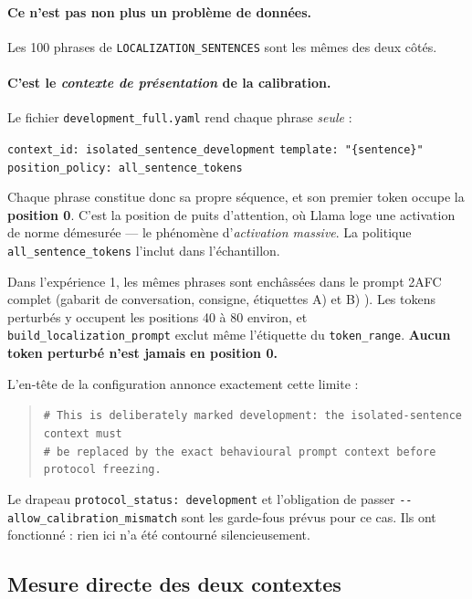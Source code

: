 \documentclass[11pt,a4paper]{article}
\newcommand{\code}[1]{\texttt{\small #1}}
\begin{document}
\paragraph{Ce n'est pas non plus un problème de données.} Les \num{100} phrases de
\code{LOCALIZATION\_SENTENCES} sont les mêmes des deux côtés.

\paragraph{C'est le \emph{contexte de présentation} de la calibration.} Le fichier
\code{development\_full.yaml} rend chaque phrase \emph{seule} :

\begin{center}
\code{context\_id: isolated\_sentence\_development} \quad
\code{template: "\{sentence\}"} \quad
\code{position\_policy: all\_sentence\_tokens}
\end{center}

\noindent
Chaque phrase constitue donc sa propre séquence, et son premier token occupe la
\textbf{position 0}. C'est la position de puits d'attention, où Llama loge une activation
de norme démesurée --- le phénomène d'\emph{activation massive}. La politique
\code{all\_sentence\_tokens} l'inclut dans l'échantillon.

Dans l'expérience 1, les mêmes phrases sont enchâssées dans le prompt 2AFC complet
(gabarit de conversation, consigne, étiquettes \og A) \fg{} et \og B) \fg). Les tokens
perturbés y occupent les positions \num{40} à \num{80} environ, et
\code{build\_localization\_prompt} exclut même l'étiquette du \code{token\_range}.
\textbf{Aucun token perturbé n'est jamais en position 0.}

L'en-tête de la configuration annonce exactement cette limite :

\begin{quote}\small
\code{\# This is deliberately marked development: the isolated-sentence context must}\\
\code{\# be replaced by the exact behavioural prompt context before protocol freezing.}
\end{quote}

\noindent
Le drapeau \code{protocol\_status: development} et l'obligation de passer
\code{-{}-allow\_calibration\_mismatch} sont les garde-fous prévus pour ce cas. Ils ont
fonctionné : rien ici n'a été contourné silencieusement.

\subsection{Mesure directe des deux contextes}
\label{sec:probe}
\end{document}
